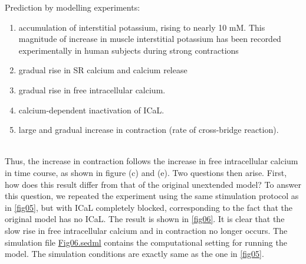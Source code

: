 \documentclass[fleqn,10pt]{physiome}
\begin{document}
Prediction by modelling experiments:
\renewcommand{\labelenumi}{(\alph{enumi})}
\begin{enumerate}
     \item accumulation of interstitial potassium, rising to nearly 10 mM. This magnitude of increase in muscle interstitial potassium has been recorded experimentally in human subjects during strong contractions \citep{green2000interstitial} 
     \item gradual rise in SR calcium and calcium release
     \item gradual rise in free intracellular calcium.
     \item calcium-dependent inactivation of ICaL.
     \item large and gradual increase in contraction (rate of cross-bridge reaction).
\end{enumerate}\\ 
Thus, the increase in contraction follows the increase in free intracellular calcium in time course, as shown in figure (c) and (e). Two questions then arise. First, how does this result differ from that of the original unextended model? To answer this question, we repeated the experiment using the same stimulation protocol as in \autoref{fig05}, but with ICaL completely blocked, corresponding to the fact that the original \citep{shorten2007mathematical} model has no ICaL.  The result is shown in \autoref{fig06}. It is clear that the slow rise in free intracellular calcium and in contraction no longer occurs. The simulation file \href{http://models.cellml.org/workspace/5f4/file/4071d5b4ec40c5e2b845a7a75e942df1966d2ba2/Fig06.sedml}{Fig06.sedml} contains the computational setting for running the model. The simulation conditions are exactly same as the one in \autoref{fig05}.
\end{document}

